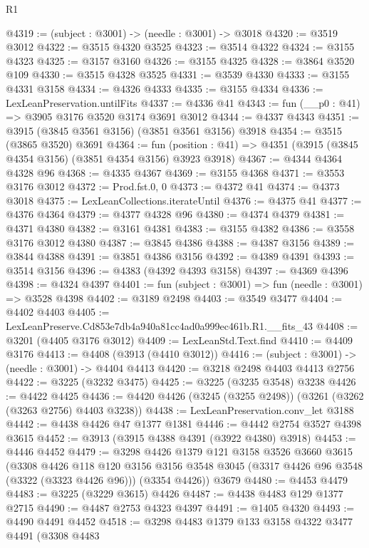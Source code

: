 \begin{lexlean}{R1}
\begin{coremodule}
@4319 := (subject : @3001) -> (needle : @3001) -> @3018
@4320 := @3519 @3012
@4322 := @3515 @4320 @3525
@4323 := @3514 @4322
@4324 := @3155 @4323
@4325 := @3157 @3160
@4326 := @3155 @4325
@4328 := @3864 @3520 @109
@4330 := @3515 @4328 @3525
@4331 := @3539 @4330
@4333 := @3155 @4331 @3158
@4334 := @4326 @4333
@4335 := @3155 @4334
@4336 := LexLeanPreservation.untilFits
@4337 := @4336 @41
@4343 := fun (__p0 : @41) => @3905 @3176 @3520 @3174 @3691 @3012
@4344 := @4337 @4343
@4351 := @3915 (@3845 @3561 @3156) (@3851 @3561 @3156) @3918
@4354 := @3515 (@3865 @3520) @3691
@4364 := fun (position : @41) => @4351 (@3915 (@3845 @4354 @3156) (@3851 @4354 @3156) @3923 @3918)
@4367 := @4344 @4364 @4328 @96
@4368 := @4335 @4367
@4369 := @3155 @4368
@4371 := @3553 @3176 @3012
@4372 := Prod.fst.{0, 0}
@4373 := @4372 @41
@4374 := @4373 @3018
@4375 := LexLeanCollections.iterateUntil
@4376 := @4375 @41
@4377 := @4376 @4364
@4379 := @4377 @4328 @96
@4380 := @4374 @4379
@4381 := @4371 @4380
@4382 := @3161 @4381
@4383 := @3155 @4382
@4386 := @3558 @3176 @3012 @4380
@4387 := @3845 @4386
@4388 := @4387 @3156
@4389 := @3844 @4388
@4391 := @3851 @4386 @3156
@4392 := @4389 @4391
@4393 := @3514 @3156
@4396 := @4383 (@4392 @4393 @3158)
@4397 := @4369 @4396
@4398 := @4324 @4397
@4401 := fun (subject : @3001) => fun (needle : @3001) => @3528 @4398
@4402 := @3189 @2498
@4403 := @3549 @3477
@4404 := @4402 @4403
@4405 := LexLeanPreserve.Cd853e7db4a940a81cc4ad0a999ec461b.R1.__fits_43
@4408 := @3201 (@4405 @3176 @3012)
@4409 := LexLeanStd.Text.find
@4410 := @4409 @3176
@4413 := @4408 (@3913 (@4410 @3012))
@4416 := (subject : @3001) -> (needle : @3001) -> @4404 @4413
@4420 := @3218 @2498 @4403 @4413 @2756
@4422 := @3225 (@3232 @3475)
@4425 := @3225 (@3235 @3548) @3238
@4426 := @4422 @4425
@4436 := @4420 @4426 (@3245 (@3255 @2498)) (@3261 (@3262 (@3263 @2756) @4403 @3238))
@4438 := LexLeanPreservation.conv_let @3188
@4442 := @4438 @4426 @47 @1377 @1381
@4446 := @4442 @2754 @3527 @4398 @3615
@4452 := @3913 (@3915 @4388 @4391 (@3922 @4380) @3918)
@4453 := @4446 @4452
@4479 := @3298
    @4426
    @1379
    @121
    @3158
    @3526
    @3660
    @3615
    (@3308
      @4426
      @118
      @120
      @3156
      @3156
      @3548
      @3045
      (@3317 @4426 @96 @3548 (@3322 (@3323 @4426 @96)))
      (@3354 @4426))
    @3679
@4480 := @4453 @4479
@4483 := @3225 (@3229 @3615) @4426
@4487 := @4438 @4483 @129 @1377 @2715
@4490 := @4487 @2753 @4323 @4397
@4491 := @1405 @4320
@4493 := @4490 @4491 @4452
@4518 := @3298
    @4483
    @1379
    @133
    @3158
    @4322
    @3477
    @4491
    (@3308
      @4483

\end{coremodule}
\end{lexlean}
